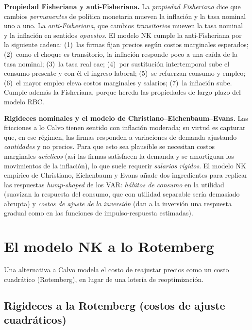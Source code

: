 \documentclass[11pt]{article}
\newenvironment{notabox}[1][Nota]%
  {\par\medskip\noindent\textbf{#1.}\enspace\ignorespaces}%
  {\par\medskip}
\theoremstyle{definition}
\begin{document}
\begin{notabox}[Propiedad Fisheriana y anti-Fisheriana]
La \emph{propiedad Fisheriana} dice que cambios \emph{permanentes} de política monetaria mueven la
inflación y la tasa nominal uno a uno. La \emph{anti-Fisheriana}, que cambios \emph{transitorios}
mueven la tasa nominal y la inflación en sentidos \emph{opuestos}. El modelo NK cumple la
anti-Fisheriana por la siguiente cadena: (1)~las firmas fijan precios según costos marginales
esperados; (2)~como el choque es transitorio, la inflación responde poco a una caída de la tasa
nominal; (3)~la tasa real cae; (4)~por sustitución intertemporal sube el consumo presente y con él el
ingreso laboral; (5)~se refuerzan consumo y empleo; (6)~el mayor empleo eleva costos marginales y
salarios; (7)~la inflación sube. Cumple además la Fisheriana, porque hereda las propiedades de largo
plazo del modelo RBC.
\end{notabox}

\textbf{Rigideces nominales y el modelo de Christiano--Eichenbaum--Evans.} Las fricciones a lo Calvo
tienen sentido con inflación moderada; su virtud es capturar que, en ese régimen, las firmas responden
a variaciones de demanda ajustando \emph{cantidades} y no precios. Para que esto sea plausible se
necesitan costos marginales \emph{acíclicos} (así las firmas satisfacen la demanda y se amortiguan los
movimientos de la inflación), lo que suele requerir \emph{salarios rígidos}. El modelo NK empírico de
Christiano, Eichenbaum y Evans añade dos ingredientes para replicar las respuestas \emph{hump-shaped}
de los VAR: \emph{hábitos de consumo} en la utilidad (suavizan la respuesta del consumo, que con
utilidad separable sería demasiado abrupta) y \emph{costos de ajuste de la inversión} (dan a la
inversión una respuesta gradual como en las funciones de impulso-respuesta estimadas).

\section{El modelo NK a lo Rotemberg}

Una alternativa a Calvo modela el costo de reajustar precios como un costo cuadrático (Rotemberg), en lugar de una lotería de reoptimización.

\subsection{Rigideces a la Rotemberg (costos de ajuste cuadráticos)}
\end{document}
